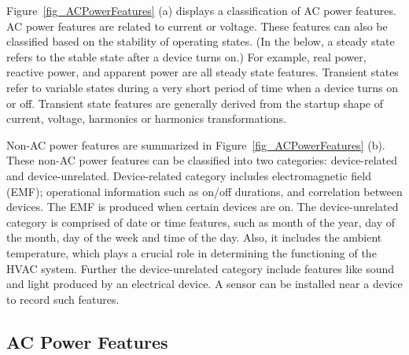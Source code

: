 
Figure~\ref{fig_ACPowerFeatures} (a) displays a classification of AC power features.
AC power features are related to current or voltage.
These features can also be classified based on the stability of operating states.
(In the below, a
steady state refers to the stable state after a device turns on.)
For example, real power, reactive power, and apparent power
are all steady state features.
Transient states refer to variable states during a very
short period of time when a device turns on or off.
Transient state features are generally derived from
the startup shape of current, voltage,
harmonics or harmonics transformations.
%

Non-AC power features are summarized in %
Figure~\ref{fig_ACPowerFeatures} (b). 
%
These non-AC power features can be classified into two categories:
device-related and device-unrelated. 
Device-related category includes electromagnetic field (EMF); 
operational information such as on/off durations, and
 correlation between devices.
The EMF is produced when certain devices are on. 
The device-unrelated category is comprised of 
date or time features, such as month of the year,
day of the month, day of the week and time of the day.  
Also, it includes the ambient temperature, which
plays a crucial role in determining the functioning
of the HVAC system.
Further the device-unrelated category include features like sound and 
light produced by an electrical device. 
A sensor can be installed near a device 
to record such features.  

\subsection{AC Power Features}
